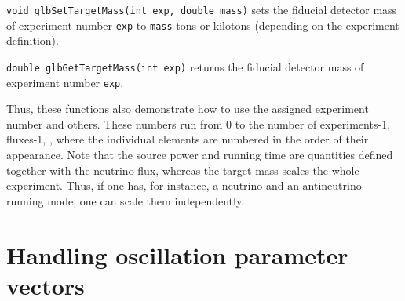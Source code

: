 \begin{function}
{\tt void glbSetTargetMass(int exp, double mass)}
sets the fiducial detector mass of experiment number {\tt exp} to {\tt mass} tons or kilotons (depending on the experiment definition).
\end{function}
\begin{function}
{\tt double glbGetTargetMass(int exp)}
returns the fiducial detector mass of experiment number {\tt exp}.
\end{function}
Thus, these functions also demonstrate how to use the assigned experiment number and others. These numbers run from $0$ to the number of experiments-1, fluxes-1, \etc, where the individual elements are numbered in the order of their appearance. 
 Note that the source power and running time are quantities defined
together with the neutrino flux, whereas the target mass scales the whole
experiment. Thus, if one has, for instance, a neutrino and an antineutrino
running mode, one can scale them independently.

\section{Handling oscillation parameter vectors}

